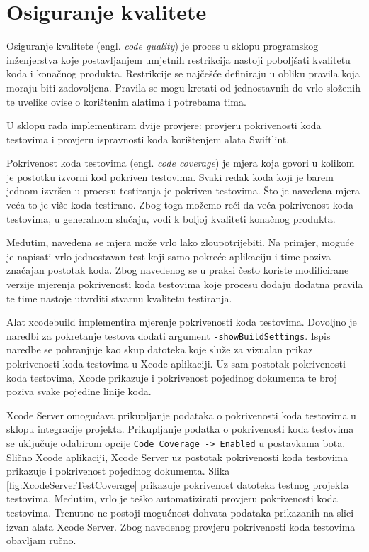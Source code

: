 \documentclass[times, utf8, diplomski, numeric]{fer}
\newcommand{\eng}[1]{(engl. \textit{#1})}
\begin{document}
\section{Osiguranje kvalitete}

Osiguranje kvalitete \eng{code quality} je proces u sklopu programskog inženjerstva koje postavljanjem umjetnih restrikcija nastoji poboljšati kvalitetu koda i konačnog produkta. Restrikcije se najčešće definiraju u obliku pravila koja moraju biti zadovoljena. Pravila se mogu kretati od jednostavnih do vrlo složenih te uvelike ovise o korištenim alatima i potrebama tima.

U sklopu rada implementiram dvije provjere: provjeru pokrivenosti koda testovima i provjeru ispravnosti koda korištenjem alata Swiftlint.

Pokrivenost koda testovima \eng{code coverage} je mjera koja govori u kolikom je postotku izvorni kod pokriven testovima. Svaki redak koda koji je barem jednom izvršen u procesu testiranja je pokriven testovima. Što je navedena mjera veća to je više koda testirano. Zbog toga možemo reći da veća pokrivenost koda testovima, u generalnom slučaju, vodi k boljoj kvaliteti konačnog produkta.

Međutim, navedena se mjera može vrlo lako zloupotrijebiti. Na primjer, moguće je napisati vrlo jednostavan test koji samo pokreće aplikaciju i time poziva značajan postotak koda. Zbog navedenog se u praksi često koriste modificirane verzije mjerenja pokrivenosti koda testovima koje procesu dodaju dodatna pravila te time nastoje utvrditi stvarnu kvalitetu testiranja\citep{wiki:CodeCoverage}.

Alat xcodebuild implementira mjerenje pokrivenosti koda testovima. Dovoljno je naredbi za pokretanje testova dodati argument \verb|-showBuildSettings|. Ispis naredbe se pohranjuje kao skup datoteka koje služe za vizualan prikaz pokrivenosti koda testovima u Xcode aplikaciji. Uz sam postotak pokrivenosti koda testovima, Xcode prikazuje i pokrivenost pojedinog dokumenta te broj poziva svake pojedine linije koda.

Xcode Server omogućava prikupljanje podataka o pokrivenosti koda testovima u sklopu integracije projekta. Prikupljanje podatka o pokrivenosti koda testovima se uključuje odabirom opcije \verb|Code Coverage -> Enabled| u postavkama bota. Slično Xcode aplikaciji, Xcode Server uz postotak pokrivenosti koda testovima prikazuje i pokrivenost pojedinog dokumenta. Slika \ref{fig:XcodeServerTestCoverage} prikazuje pokrivenost datoteka testnog projekta testovima. Međutim, vrlo je teško automatizirati provjeru pokrivenosti koda testovima. Trenutno ne postoji mogućnost dohvata podataka prikazanih na slici izvan alata Xcode Server. Zbog navedenog provjeru pokrivenosti koda testovima obavljam ručno.
\end{document}
